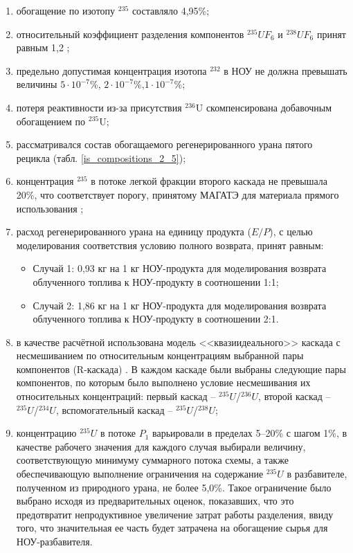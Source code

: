 \begin{enumerate}
    \item обогащение по изотопу $^{235}$ составляло 4,95\%;
    \item относительный коэффициент разделения компонентов $^{235}UF_6$ и $^{238}UF_6$ принят равным 1,2 \cite{smirnovEvolutionIsotopicComposition2012};
    \item предельно допустимая концентрация изотопа $^{232}$ в НОУ не должна превышать величины $5\cdot10^{-7}$\%, $2\cdot10^{-7}$\%,$1\cdot10^{-7}$\%;
    \item потеря реактивности из-за присутствия $^{236}$U скомпенсирована добавочным обогащением по $^{235}$U;
    \item рассматривался состав обогащаемого регенерированного урана пятого рецикла (табл. \ref{is_compositions_2_5});
    \item концентрация $^{235}$  в потоке легкой фракции второго каскада не превышала 20\%, что соответствует порогу, принятому МАГАТЭ для материала прямого использования \cite{alekseevConceptUseRecycled2010};
    \item расход регенерированного урана на единицу продукта ($E / P$), с целью моделирования соответствия условию полного возврата, принят равным:
    \begin{itemize}
        \item Случай 1: 0,93 кг на 1 кг НОУ-продукта для моделирования возврата облученного топлива к НОУ-продукту в соотношении 1:1;
        \item Случай 2: 1,86 кг на 1 кг НОУ-продукта для моделирования возврата облученного топлива к НОУ-продукту в соотношении 2:1.
    \end{itemize}
    \item в качестве расчётной использована модель <<квазиидеального>> каскада \cite{sazykinKvaziidealnyeKaskadyDlya2000} с несмешиванием по относительным концентрациям выбранной пары компонентов (R-каскада) \cite{sulaberidzeTeoriyaKaskadovDlya2011}. В каждом каскаде были выбраны следующие пары компонентов, по которым было выполнено условие несмешивания их относительных концентраций: первый каскад -- $^{235}U$/$^{236}U$, второй каскад -- $^{235}U$/$^{234}U$, вспомогательный каскад -- $^{235}U$/$^{238}U$;
    \item концентрацию $^{235}U$ в потоке $P_1$ варьировали в пределах 5--20\% с шагом 1\%, в качестве рабочего значения для каждого случая выбирали величину, соответствующую минимуму суммарного потока схемы, а также обеспечивающую выполнение ограничения на содержание $^{235}U$ в разбавителе, полученном из природного урана, не более 5,0\%. Такое ограничение было выбрано исходя из предварительных оценок, показавших, что это предотвратит непродуктивное увеличение затрат работы разделения, ввиду того, что значительная ее часть будет затрачена на обогащение сырья для НОУ-разбавителя.
\end{enumerate}

